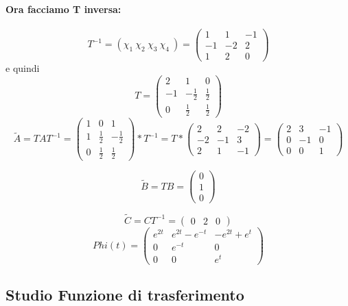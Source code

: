 \documentclass{article}
\begin{document}
\paragraph{Ora facciamo T inversa:} \[ T^{-1} = (\chi_1\ \chi_2\ \chi_3\ \chi_4\ ) = \left(\begin{matrix}1 & 1 & -1\\-1 & -2 & 2\\1 & 2 & 0\end{matrix}\right) \]
e quindi \[T = \left(\begin{matrix}2 & 1 & 0\\-1 & - \frac{1}{2} & \frac{1}{2}\\0 & \frac{1}{2} & \frac{1}{2}\end{matrix}\right)\]
\[ \widetilde{A} = TAT^{-1} = \left(\begin{matrix}1 & 0 & 1\\1 & \frac{1}{2} & - \frac{1}{2}\\0 & \frac{1}{2} & \frac{1}{2}\end{matrix}\right) * T^{-1} = T*\left(\begin{matrix}2 & 2 & -2\\-2 & -1 & 3\\2 & 1 & -1\end{matrix}\right) =\left(\begin{matrix}2 & 3 & -1\\0 & -1 & 0\\0 & 0 & 1\end{matrix}\right) \]

\[ \widetilde{B} = T B = \left(\begin{matrix}0\\1\\0\end{matrix}\right) \]

\[ \widetilde{C} = C T^{-1} = \left(\begin{matrix}0 & 2 & 0\end{matrix}\right) \]
\[Phi(t) = \left(\begin{matrix}e^{2 t} & e^{2 t} - e^{- t} & - e^{2 t} + e^{t}\\0 & e^{- t} & 0\\0 & 0 & e^{t}\end{matrix}\right) \]

\subsection{Studio Funzione di trasferimento}
\end{document}
